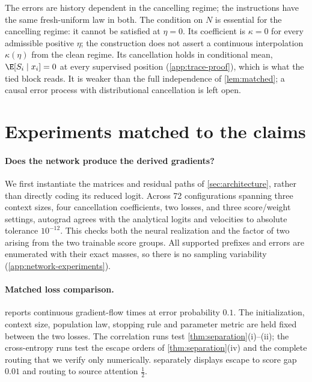 The errors are history dependent in the cancelling regime; the instructions have the same fresh-uniform law in both.
The condition on $N$ is essential for the cancelling regime: it cannot be satisfied at $\eta=0$.
Its coefficient is $\kappa=0$ for every admissible positive $\eta$; the construction does not assert a continuous interpolation $\kappa(\eta)$ from the clean regime.
Its cancellation holds in conditional mean, $\E[S_i\mid x_i]=0$ at every supervised position (\cref{app:trace-proof}), which is what the tied block reads.
It is weaker than the full independence of \cref{lem:matched}; a causal error process with distributional cancellation is left open.

\section{Experiments matched to the claims}
\label{sec:numerics}

\paragraph{Does the network produce the derived gradients?}
We first instantiate the matrices and residual paths of \cref{sec:architecture}, rather than directly coding its reduced logit.
Across 72 configurations spanning three context sizes, four cancellation coefficients, two losses, and three score/weight settings,
autograd agrees with the analytical logits and velocities to absolute tolerance $10^{-12}$.
This checks both the neural realization and the factor of two arising from the two trainable score groups.
All supported prefixes and errors are enumerated with their exact masses, so there is no sampling variability (\cref{app:network-experiments}).

\paragraph{Matched loss comparison.}
 reports continuous gradient-flow times at error probability $0.1$.
The initialization, context size, population law, stopping rule and parameter metric are held fixed between the two losses.
The correlation runs test \cref{thm:separation}(i)--(ii); the cross-entropy runs test the escape orders of \cref{thm:separation}(iv)
and the complete routing that we verify only numerically.
 separately displays escape to score gap $0.01$ and routing to source attention $\tfrac{1}{2}$.

